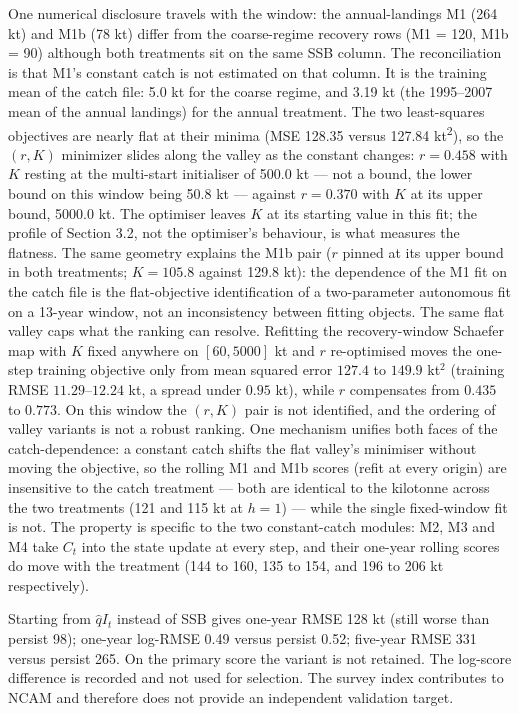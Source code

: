 \documentclass[11pt]{article}
\begin{document}
One numerical disclosure travels with the window: the annual-landings M1
(264 kt) and M1b (78 kt) differ from the coarse-regime recovery rows (M1
= 120, M1b = 90) although both treatments sit on the same SSB column.
The reconciliation is that M1's constant catch is not estimated on that
column. It is the training mean of the catch file: 5.0 kt for the coarse
regime, and 3.19 kt (the 1995--2007 mean of the annual landings) for the
annual treatment. The two least-squares objectives are nearly flat at
their minima (MSE 128.35 versus 127.84 kt\textsuperscript{2}), so the
\((r, K)\) minimizer slides along the valley as the constant changes:
\(r = 0.458\) with \(K\) resting at the multi-start initialiser of
500.0 kt --- not a bound, the lower bound on this window being 50.8 kt
--- against \(r = 0.370\) with \(K\) at its upper bound, 5000.0 kt. The optimiser leaves \(K\) at its starting value in this fit; the
profile of Section 3.2, not the optimiser's behaviour, is what
measures the flatness. The
same geometry explains the M1b pair (\(r\) pinned at its
upper bound in both treatments; \(K = 105.8\) against 129.8 kt): the
dependence of the M1 fit on the catch file is the flat-objective
identification of a two-parameter autonomous fit on a 13-year window,
not an inconsistency between fitting objects. The same flat valley caps what the ranking can resolve. Refitting the
recovery-window Schaefer map with \(K\) fixed anywhere on
\([60, 5000]\) kt and \(r\) re-optimised moves the one-step training
objective only from mean squared error \(127.4\) to \(149.9\) kt\(^2\)
(training RMSE \(11.29\)--\(12.24\) kt, a spread under \(0.95\) kt),
while \(r\) compensates from \(0.435\) to \(0.773\). On this window the
\((r, K)\) pair is not identified, and the ordering of valley variants
is not a robust ranking. One mechanism
unifies both faces of the catch-dependence: a constant catch shifts the
flat valley's minimiser without moving the objective, so the rolling
M1 and M1b scores (refit at every origin) are insensitive to the catch
treatment --- both are identical to the kilotonne across the two
treatments (121 and 115 kt at \(h=1\)) --- while the single
fixed-window fit is not. The property is specific to the two
constant-catch modules: M2, M3 and M4 take \(C_t\) into the state
update at every step, and their one-year rolling scores do move with the
treatment (144 to 160, 135 to 154, and 196 to 206 kt respectively).

Starting from \(\hat q I_t\) instead of SSB gives one-year RMSE 128 kt
(still worse than persist 98); one-year log-RMSE 0.49 versus persist
0.52; five-year RMSE 331 versus persist 265. On the primary score the
variant is not retained. The log-score difference is recorded and not
used for selection. The survey index contributes to NCAM and therefore
does not provide an independent validation target.
\end{document}
